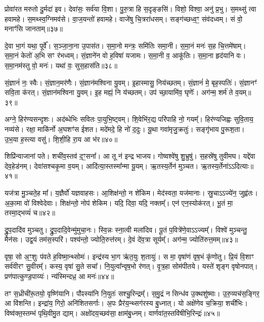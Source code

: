 प्रोवा॑रत मरुतो दु॒र्मदा॑ इव।
देवा॑सः॒ सर्व॑या वि॒शा।
पु॒रु॒त्रा हि स॒दृङ्ङसि॑।
विशो॒ विश्वा॒ अनु॑ प्र॒भु।
स॒मथ्सु॑ त्वा हवामहे।
स॒मथ्स्व॒ग्निमव॑से।
वा॒ज॒यन्तो॑ हवामहे।
वाजे॑षु चि॒त्ररा॑धसम्।
सङ्ग॑च्छध्व॒ꣳ॒ संव॑दध्वम्।
सं वो॒ मनाꣳ॑सि जानताम्॥३७॥

दे॒वा भा॒गं यथा॒ पूर्वे᳚।
स॒ञ्जा॒ना॒ना उ॒पास॑त।
स॒मा॒नो मन्त्रः॒ समि॑तिः समा॒नी।
स॒मा॒नं मनः॑ स॒ह चि॒त्तमे॑षाम्।
स॒मा॒नं केतो॑ अ॒भि सꣳ र॑भध्वम्।
सं॒ज्ञाने॑न वो ह॒विषा॑ यजामः।
स॒मा॒नी व॒ आकू॑तिः।
स॒मा॒ना हृद॑यानि वः।
स॒मा॒नम॑स्तु वो॒ मनः॑।
यथा॑ वः॒ सुस॒हास॑ति॥३८॥

सं॒ज्ञानं॑ नः॒ स्वैः।
सं॒ज्ञान॒मर॑णैः।
सं॒ज्ञान॑मश्विना यु॒वम्।
इ॒हास्मासु॒ निय॑च्छतम्।
सं॒ज्ञानं॑ मे॒ बृह॒स्पतिः॑।
सं॒ज्ञानꣳ॑ सवि॒ता क॑रत्।
सं॒ज्ञान॑मश्विना यु॒वम्।
इ॒ह मह्यं॒ नि य॑च्छतम्।
उप॑ च्छा॒यामि॑व॒ घृणेः᳚।
अग॑न्म॒ शर्म॑ ते व॒यम्॥३९॥

अग्ने॒ हिर॑ण्यसन्दृशः।
अद॑ब्धेभिः सवितः पा॒युभि॒ष्ट्वम्।
शि॒वेभि॑र॒द्य परि॑पाहि नो॒ गयम्᳚।
हिर॑ण्यजिह्वः सुवि॒ताय॒ नव्य॑से।
रक्षा॒ माकि॑र्नो अ॒घशꣳ॑स ईशत।
मदे॑मदे॒ हि नो॑ द॒दुः।
यू॒था गवा॑मृजु॒क्रतुः॑।
सङ्गृ॑भाय पु॒रूश॒ता।
उ॒भ॒या ह॒स्त्या वसु॑।
शि॒शी॒हि रा॒य आ भ॑र॥४०॥

शिप्रि॑न्वाजानां पते।
शची॑व॒स्तव॑ द॒ꣳ॒सना᳚।
आ तू न॑ इन्द्र भाजय।
गोष्वश्वे॑षु शु॒भ्रुषु॑।
स॒हस्रे॑षु तुवीमघ।
यद्दे॑वा देव॒हेड॑नम्।
देवा॑सश्चकृ॒मा व॒यम्।
आदि॑त्या॒स्तस्मा᳚न्मा यू॒यम्।
ऋ॒तस्य॒र्तेन॑ मुञ्चत।
ऋ॒तस्य॒र्तेना॑ऽऽदित्याः॥४१॥

यज॑त्रा मु॒ञ्चते॒ह मा᳚।
य॒ज्ञैर्वो॑ यज्ञवाहसः।
आ॒शिक्ष॑न्तो॒ न शे॑किम।
मेद॑स्वता॒ यज॑मानाः।
स्रु॒चा\-ऽऽज्ये॑न॒ जुह्व॑तः।
अ॒का॒मा वो॑ विश्वेदेवाः।
शिक्ष॑न्तो॒ नोप॑ शेकिम।
यदि॒ दिवा॒ यदि॒ नक्तम्᳚।
एन॑ एन॒स्योक॑रत्।
भू॒तं मा॒ तस्मा॒द्भव्यं॑ च॥४२॥

द्रु॒प॒दादि॑व मुञ्चतु।
द्रु॒प॒दादि॒वेन्मु॑मुचा॒नः।
स्वि॒न्नः स्ना॒त्वी मला॑दिव।
पू॒तं प॒वित्रे॑णे॒वाऽऽज्यम्᳚।
विश्वे॑ मुञ्चन्तु॒ मैन॑सः।
उद्व॒यं तम॑स॒स्परि॑।
पश्य॑न्तो॒ ज्योति॒रुत्त॑रम्।
दे॒वं दे॑व॒त्रा सूर्यम्᳚।
अग॑न्म॒ ज्योति॑रुत्त॒मम्॥४३॥\anuvakamend[तव॑ कृधि॒ वन॒स्पती᳚ञ्जानता॒मस॑ति व॒यं भ॑रादित्याश्च॒ नव॑ च]

वृषा॒ सो अ॒ꣳ॒शुः प॑वते ह॒विष्मा॒न्थ्सोमः॑।
इन्द्र॑स्य भा॒ग ऋ॑त॒युः श॒तायुः॑।
स मा॒ वृषा॑णं वृष॒भं कृ॑णोतु।
प्रि॒यं वि॒शाꣳ सर्व॑वीरꣳ सु॒वीरम्᳚।
कस्य॒ वृषा॑ सु॒ते सचा᳚।
नि॒युत्वा᳚न्वृष॒भो र॑णत्।
वृ॒त्र॒हा सोम॑पीतये।
यस्ते॑ शृङ्ग वृषोनपात्।
प्रण॑पात्कुण्ड॒पाय्यः॑।
न्य॑स्मिन्दध्र॒ आ मनः॑॥४४॥

तꣳ स॒ध्रीची॑रू॒तयो॒ वृष्णि॑यानि।
पौꣴस्या॑नि नि॒युतः॑ सश्चु॒\-रिन्द्रम्᳚।
स॒मु॒द्रं न सिन्ध॑व उ॒क्थशु॑ष्माः।
उ॒रु॒व्यच॑स॒ङ्गिर॒ आ वि॑शन्ति।
इन्द्रा॑य॒ गिरो॒ अनि॑शितसर्गाः।
अ॒पः प्रैर॑य॒न्थ्सग॑रस्य बु॒ध्नात्।
यो अक्षे॑णेव च॒क्रिया॒ शची॑भिः।
विष्व॑क्त॒स्तम्भ॑ पृथि॒वीमु॒त द्याम्।
अक्षो॑दय॒च्छव॑सा॒ क्षाम॑बु॒ध्नम्।
वार्णवा॑त॒स्तवि॑षीभि॒रिन्द्रः॑॥४५॥

